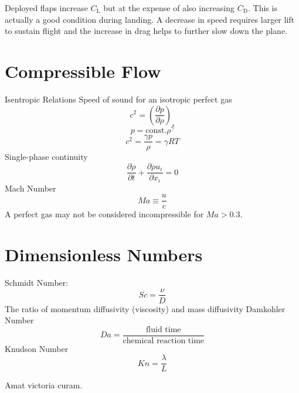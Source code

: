 \documentclass{article}
\begin{document}
Deployed flaps increase $C_\text{L}$ but at the expense of also increasing $C_\text{D}$. This is actually a good condition during landing. A decrease in speed requires larger lift to sustain flight and the increase in drag helps to further slow down the plane.
\clearpage

%
%
\newpage
\section{Compressible Flow}

Isentropic Relations
\newline
\newline
Speed of sound for an isotropic perfect gas
\begin{equation}
  c^2 = \left(\frac{\partial p}{\partial \rho}\right)_s
\end{equation}
\begin{equation}
  p = \text{const.} \rho^\gamma
\end{equation}
\begin{equation}
  c^2 = \frac{\gamma p}{\rho} = \gamma R T
\end{equation}
\newline
\newline
Single-phase continuity
\begin{equation}
  \frac{\partial \rho}{\partial t} + \frac{\partial \rho u_i}{\partial x_i} = 0
\end{equation}
\newline
\newline
Mach Number
\begin{equation}
  Ma \equiv \frac{u}{c}
\end{equation}
\newline
\newline
A perfect gas may not be considered incompressible for $Ma > 0.3$.

%
%
\newpage
\section{Dimensionless Numbers}
Schmidt Number:
\begin{equation}
  Sc = \frac{\nu}{D}
\end{equation}
The ratio of momentum diffusivity (viscosity) and mass diffusivity
\newline
\newline
Damkohler Number
\begin{equation}
  Da = \frac{\textrm{fluid time}}{\textrm{chemical reaction time}}
\end{equation}
\newline
\newline
Knudson Number
\begin{equation}
  Kn = \frac{\lambda}{L}
\end{equation}

\newpage
Amat victoria curam. 
\end{document}
